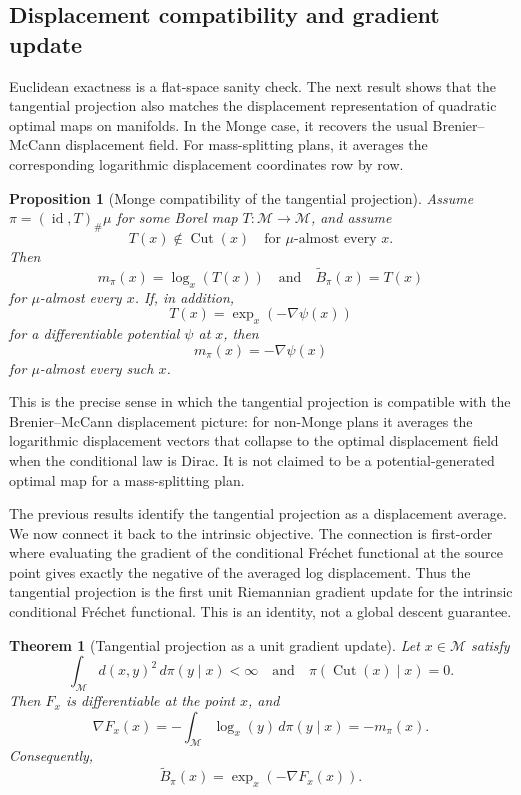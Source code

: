 \documentclass[10pt]{article} %
\newtheorem{theorem}{Theorem}
\newtheorem{proposition}[proposition]{Proposition}
\theoremstyle{definition}
\providecommand{\1}{\mathbf{1}}
\providecommand{\sM}{\mathcal{M}}
\DeclareMathOperator{\Cut}{Cut}
\DeclareMathOperator{\id}{id}
\begin{document}
\subsection{Displacement compatibility and gradient update}

Euclidean exactness is a flat-space sanity check. The next result shows that
the tangential projection also matches the displacement representation of
quadratic optimal maps on manifolds. In the Monge case, it recovers the usual
Brenier--McCann displacement field. For mass-splitting plans, it averages the
corresponding logarithmic displacement coordinates row by row.


\begin{proposition}[Monge compatibility of the tangential projection]
\label{prop:tangent_monge}
Assume $\pi=(\id,T)_\#\mu$ for some Borel map $T:\sM\to\sM$, and assume
\[
T(x)\notin\Cut(x)
\quad\text{for }\mu\text{-almost every }x.
\]
Then
\[
m_\pi(x)=\log_x(T(x))
\quad\text{and}\quad
\widetilde B_\pi(x)=T(x)
\]
for $\mu$-almost every $x$. If, in addition,
\[
T(x)=\exp_x(-\nabla\psi(x))
\]
for a differentiable potential $\psi$ at $x$, then
\[
m_\pi(x)=-\nabla\psi(x)
\]
for $\mu$-almost every such $x$.
\end{proposition}



This is the precise sense in which the tangential projection is compatible with the Brenier--McCann displacement picture: for non-Monge plans it averages the logarithmic displacement vectors that collapse to the optimal displacement field when the conditional law is Dirac. It is not claimed to be a potential-generated optimal map for a mass-splitting plan.

The previous results identify the tangential projection as a displacement average. We now connect it back to the intrinsic objective. The connection is first-order where evaluating the gradient of the conditional Fr\'echet functional at the source point gives exactly the negative of the averaged log displacement. Thus the tangential projection is the first unit Riemannian gradient update for the intrinsic conditional Fr\'echet functional. This is an identity, not a global descent guarantee.

\begin{theorem}[Tangential projection as a unit gradient update]
\label{thm:tangent_gradient}
Let $x\in\sM$ satisfy
\[
\int_{\sM} d(x,y)^2\,d\pi(y\mid x)<\infty
\quad\text{and}\quad
\pi(\Cut(x)\mid x)=0.
\]
Then $F_x$ is differentiable at the point $x$, and
\[
\nabla F_x(x)=-\int_{\sM}\log_x(y)\,d\pi(y\mid x)=-m_\pi(x).
\]
Consequently,
\[
\widetilde B_\pi(x)=\exp_x(-\nabla F_x(x)).
\]
\end{theorem}
\end{document}
